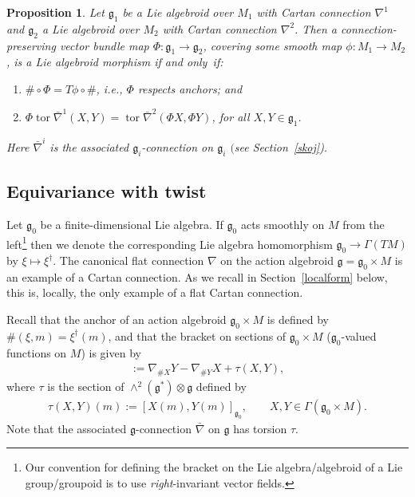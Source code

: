 \documentclass[pdftex]{sigma}
\DeclareMathOperator{\torsion}{tor}
\numberwithin{equation}{section}
\newtheorem{PropositionBlaom}[TheoremBlaom]{Proposition}
 { \theoremstyle{definition}
\newtheorem{CounterexampleBlaom}[TheoremBlaom]{Counterexample}
\newtheorem{RemarkBlaom}[TheoremBlaom]{Remark} }
\begin{document}
\begin{PropositionBlaom}\label{Proposition2.1}
  Let ${\mathfrak g}_1$ be a Lie algebroid over $M_1$ with Cartan
  connection $\nabla^1$ and ${\mathfrak g}_2$ a Lie algebroid over
  $M_2$ with Cartan connection $\nabla^2$. Then a
  connection-preserving vector bundle map $\Phi \colon {\mathfrak g}_1
  \rightarrow {\mathfrak g}_2 $, covering some smooth map $\phi \colon
  M_1 \rightarrow M_2$, is a Lie algebroid morphism if and only~if:
  \begin{enumerate}\itemsep=0pt
  \item[$(1)$] $\# \circ \Phi =T\phi \circ \# $, i.e., $\Phi$ respects
    anchors; and
  \item[$(2)$] $\Phi \torsion \bar \nabla^1 (X,Y)=\torsion \bar\nabla^2(\Phi
    X, \Phi Y) $, for all $X,Y\in{\mathfrak g}_1$.
  \end{enumerate}
  Here $\bar \nabla ^i$ is the associated ${\mathfrak g}_i$-connection
  on ${\mathfrak g}_i$ $($see Section~{\rm \ref{skoj})}.
\end{PropositionBlaom}

\subsection{Equivariance with twist}\label{morph2}

Let ${\mathfrak g}_0$ be a f\/inite-dimensional Lie algebra. If
${\mathfrak g}_0$ acts smoothly on $M$ from the left\footnote{Our
  convention for def\/ining the bracket on the Lie algebra/algebroid of
  a Lie group/groupoid is to use {\em right}-invariant vector f\/ields.}
then we denote the corresponding Lie algebra homomorphism ${\mathfrak
  g}_0 \rightarrow \Gamma(TM)$ by $\xi \mapsto \xi^\dagger$. The
canonical f\/lat connection $\nabla$ on the action algebroid ${\mathfrak
  g}={\mathfrak g}_0 \times M$ is an example of a Cartan
connection. As we recall in Section~\ref{localform} below, this is, locally, the
only example of a f\/lat Cartan connection.

Recall that the anchor of an action algebroid ${\mathfrak g}_0 \times
M$ is def\/ined by $\#(\xi,m)=\xi^\dagger(m)$, and that the bracket on
sections of ${\mathfrak g}_0 \times M$ (${\mathfrak g}_0$-valued
functions on $M$) is given by
\begin{gather}
  [ X, Y]:=\nabla_{\#X}Y-\nabla_{\#Y}X+\tau (X,Y),\label{qwq}
\end{gather}
where $\tau$ is the section of $\wedge^2({\mathfrak g}^*)\otimes
{\mathfrak g} $ def\/ined by
\begin{gather*}
        \tau (X, Y)(m):=[X(m), Y(m)]_{{\mathfrak g}_0},\qquad
        X,Y\in\Gamma(\mathfrak g_0\times M).
\end{gather*}
Note that the associated ${\mathfrak g}$-connection $\bar\nabla$ on
${\mathfrak g}$ has torsion $\tau$.
\end{document}
